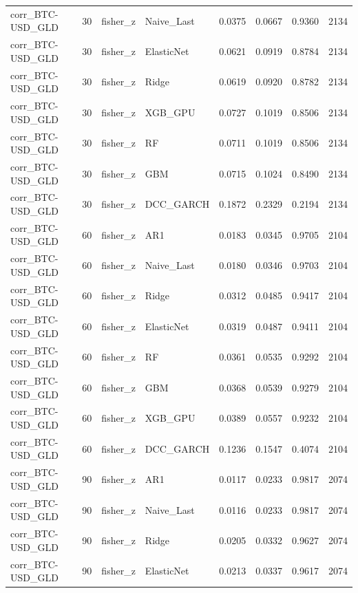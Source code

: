 \begin{table}[H]
\begin{tabular}{llllrrrr}
corr_BTC-USD_GLD & 30 & fisher_z & Naive_Last & 0.0375 & 0.0667 & 0.9360 & 2134 \\
corr_BTC-USD_GLD & 30 & fisher_z & ElasticNet & 0.0621 & 0.0919 & 0.8784 & 2134 \\
corr_BTC-USD_GLD & 30 & fisher_z & Ridge & 0.0619 & 0.0920 & 0.8782 & 2134 \\
corr_BTC-USD_GLD & 30 & fisher_z & XGB_GPU & 0.0727 & 0.1019 & 0.8506 & 2134 \\
corr_BTC-USD_GLD & 30 & fisher_z & RF & 0.0711 & 0.1019 & 0.8506 & 2134 \\
corr_BTC-USD_GLD & 30 & fisher_z & GBM & 0.0715 & 0.1024 & 0.8490 & 2134 \\
corr_BTC-USD_GLD & 30 & fisher_z & DCC_GARCH & 0.1872 & 0.2329 & 0.2194 & 2134 \\
corr_BTC-USD_GLD & 60 & fisher_z & AR1 & 0.0183 & 0.0345 & 0.9705 & 2104 \\
corr_BTC-USD_GLD & 60 & fisher_z & Naive_Last & 0.0180 & 0.0346 & 0.9703 & 2104 \\
corr_BTC-USD_GLD & 60 & fisher_z & Ridge & 0.0312 & 0.0485 & 0.9417 & 2104 \\
corr_BTC-USD_GLD & 60 & fisher_z & ElasticNet & 0.0319 & 0.0487 & 0.9411 & 2104 \\
corr_BTC-USD_GLD & 60 & fisher_z & RF & 0.0361 & 0.0535 & 0.9292 & 2104 \\
corr_BTC-USD_GLD & 60 & fisher_z & GBM & 0.0368 & 0.0539 & 0.9279 & 2104 \\
corr_BTC-USD_GLD & 60 & fisher_z & XGB_GPU & 0.0389 & 0.0557 & 0.9232 & 2104 \\
corr_BTC-USD_GLD & 60 & fisher_z & DCC_GARCH & 0.1236 & 0.1547 & 0.4074 & 2104 \\
corr_BTC-USD_GLD & 90 & fisher_z & AR1 & 0.0117 & 0.0233 & 0.9817 & 2074 \\
corr_BTC-USD_GLD & 90 & fisher_z & Naive_Last & 0.0116 & 0.0233 & 0.9817 & 2074 \\
corr_BTC-USD_GLD & 90 & fisher_z & Ridge & 0.0205 & 0.0332 & 0.9627 & 2074 \\
corr_BTC-USD_GLD & 90 & fisher_z & ElasticNet & 0.0213 & 0.0337 & 0.9617 & 2074 \\
\bottomrule
\end{tabular}
\end{table}